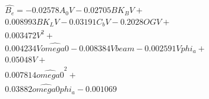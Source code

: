 \begin{equation} \label{eq:polynom_complex}
\begin{aligned} 
 \hat{B_{e}} = - 0.02578 A_{0} V - 0.02705 BK_{B} V + \\ 
 0.008993 BK_{L} V - 0.03191 C_{b} V - 0.2028 OG V + \\ 
 0.003472 V^{2} + \\ 
 0.004234 V \hat{omega0} - 0.008384 V beam - 0.002591 V phi_{a} + \\ 
 0.05048 V + \\ 
 0.007814 \hat{omega0}^{2} + \\ 
 0.03882 \hat{omega0} phi_{a} - 0.001069 \\ 
 \end{aligned}
\end{equation}
